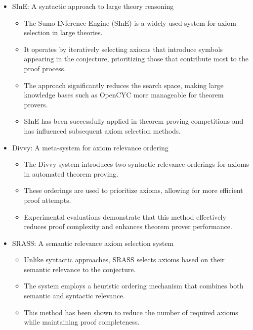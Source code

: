 \documentclass[english,version-2020-11]{uzl-thesis}
\begin{document}
\begin{itemize}
    \item SInE: A syntactic approach to large theory reasoning \cite{Hoder2011}
    \begin{itemize}
        \item The Sumo INference Engine (SInE) is a widely used system for axiom selection in large theories.
        \item It operates by iteratively selecting axioms that introduce symbols appearing in the conjecture, prioritizing those that contribute most to the proof process.
        \item The approach significantly reduces the search space, making large knowledge bases such as OpenCYC more manageable for theorem provers.
        \item SInE has been successfully applied in theorem proving competitions and has influenced subsequent axiom selection methods.
    \end{itemize}
    
    \item Divvy: A meta-system for axiom relevance ordering \cite{Roederer2009}
    \begin{itemize}
        \item The Divvy system introduces two syntactic relevance orderings for axioms in automated theorem proving.
        \item These orderings are used to prioritize axioms, allowing for more efficient proof attempts.
        \item Experimental evaluations demonstrate that this method effectively reduces proof complexity and enhances theorem prover performance.
    \end{itemize}
    
    \item SRASS: A semantic relevance axiom selection system \cite{Sutcliffe2007}
    \begin{itemize}
        \item Unlike syntactic approaches, SRASS selects axioms based on their semantic relevance to the conjecture.
        \item The system employs a heuristic ordering mechanism that combines both semantic and syntactic relevance.
        \item This method has been shown to reduce the number of required axioms while maintaining proof completeness.
    \end{itemize}
    

\end{itemize}
\end{document}
